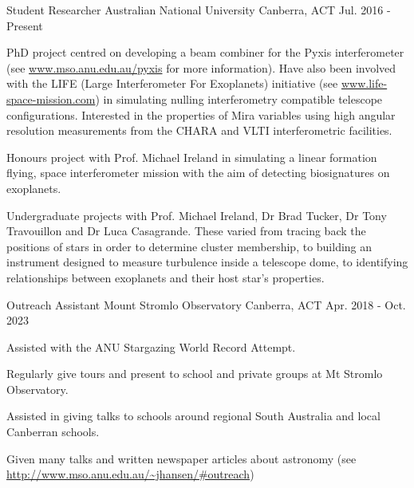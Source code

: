 
\begin{cventries}

  \cventry
    {Student Researcher} %
    {Australian National University} %
    {Canberra, ACT} %
    {Jul. 2016 - Present} %
    {
      \begin{cvitems} %
        \item {PhD project centred on developing a beam combiner for the Pyxis interferometer (see \url{www.mso.anu.edu.au/pyxis} for more information). Have also been involved with the LIFE (Large Interferometer For Exoplanets) initiative (see \url{www.life-space-mission.com}) in simulating nulling interferometry compatible telescope configurations. Interested in the properties of Mira variables using high angular resolution measurements from the CHARA and VLTI interferometric facilities.}
        \item {Honours project with Prof. Michael Ireland in simulating a linear formation flying, space interferometer mission with the aim of detecting biosignatures on exoplanets.}
        \item {Undergraduate projects with Prof. Michael Ireland, Dr Brad Tucker, Dr Tony Travouillon and Dr Luca Casagrande. These varied from tracing back the positions of stars in order to determine cluster membership, to building an instrument designed to measure turbulence inside a telescope dome, to identifying relationships between exoplanets and their host star's properties.}
      \end{cvitems}
    }

  \cventry
    {Outreach Assistant} %
    {Mount Stromlo Observatory} %
    {Canberra, ACT} %
    {Apr. 2018 - Oct. 2023} %
    {
      \begin{cvitems} %
        \item {Assisted with the ANU Stargazing World Record Attempt.}
        \item {Regularly give tours and present to school and private groups at Mt Stromlo Observatory.}
        \item {Assisted in giving talks to schools around regional South Australia and local Canberran schools.}
        \item {Given many talks and written newspaper articles about astronomy (see \url{http://www.mso.anu.edu.au/~jhansen/\#outreach})}
      \end{cvitems}
    }
    


\end{cventries}
